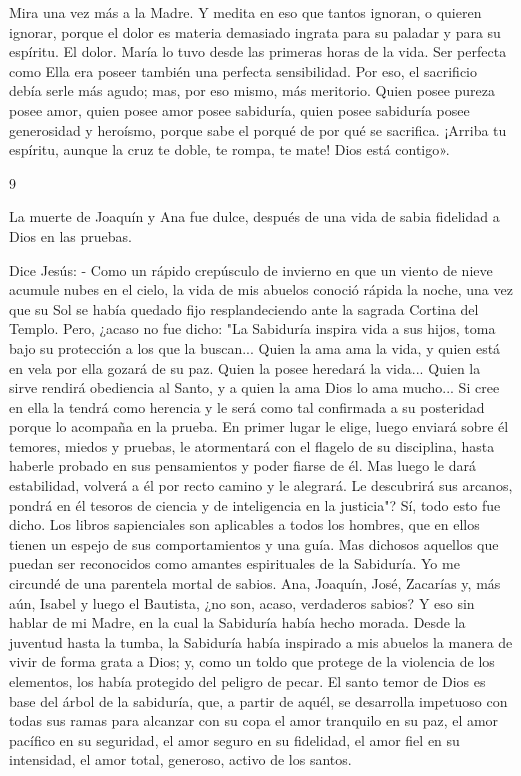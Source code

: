 \documentclass[12pt]{book} %
\begin{document}
Mira una vez más a la Madre. Y medita en eso que tantos ignoran, o quieren ignorar, porque el dolor es materia 
demasiado ingrata para su paladar y para su espíritu. El dolor. María lo tuvo desde las primeras horas de la vida. Ser perfecta como Ella era poseer también una perfecta sensibilidad. Por eso, el sacrificio debía serle más agudo; mas, por eso mismo, más meritorio. Quien posee pureza posee amor, quien posee amor posee sabiduría, quien posee sabiduría posee generosidad y heroísmo, porque sabe el porqué de por qué se sacrifica. 
¡Arriba tu espíritu, aunque la cruz te doble, te rompa, te mate! Dios está contigo». 
 
 
9 
 
La muerte de Joaquín y Ana fue dulce, después de una vida de sabia fidelidad a Dios en las pruebas. 
 
 
Dice Jesús: 
- Como un rápido crepúsculo de invierno en que un viento de nieve acumule nubes en el cielo, la vida de mis abuelos 
conoció rápida  la noche, una vez que su Sol se había quedado fijo resplandeciendo ante la sagrada Cortina del Templo. 
Pero, ¿acaso no fue dicho: "La Sabiduría inspira vida a sus hijos, toma bajo su protección a los que la buscan... Quien la ama ama la vida, y quien está en vela por ella gozará de su paz. Quien la posee heredará la vida... Quien la sirve rendirá obediencia al Santo, y a quien la ama Dios lo ama mucho... Si cree en ella la tendrá como herencia y le será como tal confirmada a su posteridad porque lo acompaña en la prueba. En primer lugar le elige, luego enviará sobre él temores, miedos y pruebas, le atormentará con el flagelo de su disciplina, hasta haberle probado en sus pensamientos y poder fiarse de él. Mas luego le dará estabilidad, volverá a él por recto camino y le alegrará. Le descubrirá sus arcanos, pondrá en él tesoros de ciencia y de inteligencia en la justicia"? 
Sí, todo esto fue dicho. Los libros sapienciales son aplicables a todos los hombres, que en ellos tienen un espejo de sus comportamientos y una guía. Mas dichosos aquellos que puedan ser reconocidos como amantes espirituales de la Sabiduría. 
Yo me circundé de una parentela mortal de sabios. Ana, Joaquín, José, Zacarías y, más aún, Isabel y luego el Bautista, ¿no son, acaso, verdaderos sabios? Y eso sin hablar de mi Madre, en la cual la Sabiduría había hecho morada. 
Desde la juventud hasta la tumba, la Sabiduría había inspirado a mis abuelos la manera de vivir de forma grata a Dios; y, 
como un toldo que protege de la violencia de los elementos, los había protegido del peligro de pecar. El santo temor de Dios es base del árbol de la sabiduría, que, a partir de aquél, se desarrolla impetuoso con todas sus ramas para alcanzar con su copa el amor tranquilo en su paz, el amor pacífico en su seguridad, el amor seguro en su fidelidad, el amor fiel en su intensidad, el amor total, generoso, activo de los santos. 
\end{document}
